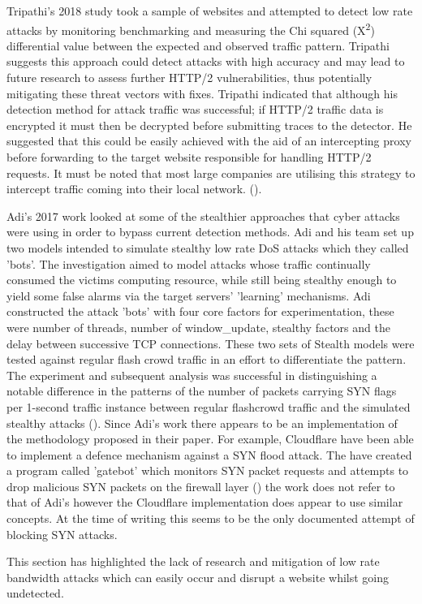 Tripathi's 2018 study took a sample of websites and attempted to detect low rate attacks by monitoring benchmarking and measuring the Chi squared (X\textsuperscript{\small2}) differential value between the expected and observed traffic pattern. Tripathi suggests this approach could detect attacks with high accuracy and may lead to future research to assess further HTTP/2 vulnerabilities, thus potentially mitigating these threat vectors with fixes. Tripathi indicated that although his detection method for attack traffic was successful; if HTTP/2 traffic data is encrypted it must then be decrypted before submitting traces to the detector. He suggested that this could be easily achieved with the aid of an intercepting proxy before forwarding to the target website responsible for handling HTTP/2 requests. It must be noted that most large companies are utilising this strategy to intercept traffic coming into their local network. (\cite{tripathi2018slow}). 

Adi's 2017 work looked at some of the stealthier approaches that cyber attacks were using in order to bypass current detection methods. Adi and his team set up two models intended to simulate stealthy low rate DoS attacks which they called 'bots'. The investigation aimed to model attacks whose traffic continually consumed the victims computing resource, while still being stealthy enough to yield some false alarms via the target servers' 'learning' mechanisms. Adi constructed the attack 'bots' with four core factors for experimentation, these were number of threads, number of window\_update, stealthy factors and the delay between successive TCP connections. These two sets of Stealth models were tested against regular flash crowd traffic in an effort to differentiate the pattern. The experiment and subsequent analysis was successful in distinguishing a notable difference in the patterns of the number of packets carrying SYN flags per 1-second traffic instance between regular flashcrowd traffic and the simulated stealthy attacks (\cite{adi2017stealthy}). Since Adi's work there appears to be an implementation of the methodology proposed in their paper. For example, Cloudflare have been able to implement a defence mechanism against a SYN flood attack. The have created a program called 'gatebot' which monitors SYN packet requests and attempts to drop malicious SYN packets on the firewall layer (\cite{CFSYN}) the work does not refer to that of Adi's however the Cloudflare implementation does appear to use similar concepts. At the  time of writing this seems to be the only documented attempt of blocking SYN attacks.

This section has highlighted the lack of research and mitigation of low rate bandwidth attacks which can easily occur and disrupt a website whilst going undetected.